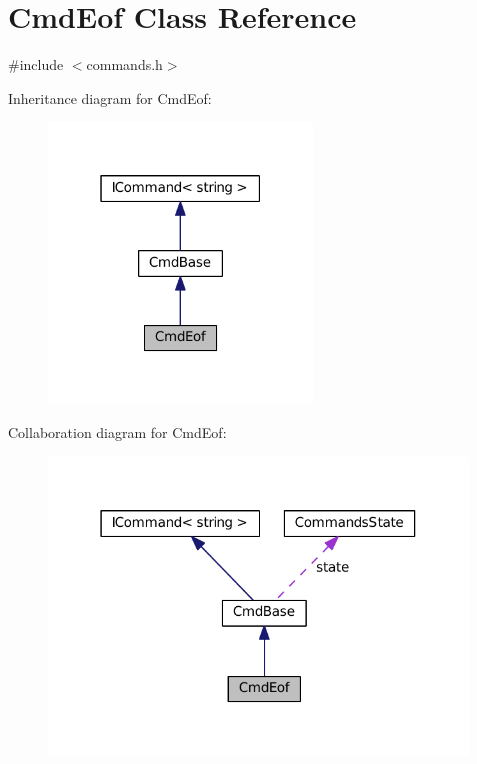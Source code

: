\hypertarget{class_cmd_eof}{}\section{Cmd\+Eof Class Reference}
\label{class_cmd_eof}


{\ttfamily \#include $<$commands.\+h$>$}



Inheritance diagram for Cmd\+Eof\+:
\nopagebreak
\begin{figure}[H]
\begin{center}
\leavevmode
\includegraphics[width=199pt]{class_cmd_eof__inherit__graph}
\end{center}
\end{figure}


Collaboration diagram for Cmd\+Eof\+:
\nopagebreak
\begin{figure}[H]
\begin{center}
\leavevmode
\includegraphics[width=316pt]{class_cmd_eof__coll__graph}
\end{center}
\end{figure}
